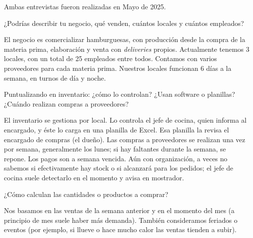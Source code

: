 
Ambas entrevistas fueron realizadas en Mayo de 2025.
\begin{description}[leftmargin=0cm, labelsep=0.5cm]

  \item[\textbf{Entrevistador:}] ¿Podrías describir tu negocio, qué venden, cuántos locales y cuántos empleados?

  \item[\textbf{Ulises Litterio:}] El negocio es comercializar hamburguesas, con producción desde la compra de la materia prima, elaboración y venta con \textit{deliveries} propios. Actualmente tenemos 3 locales, con un total de 25 empleados entre todos. Contamos con varios proveedores para cada materia prima. Nuestros locales funcionan 6 días a la semana, en turnos de día y noche.

  \item[\textbf{Entrevistador:}] Puntualizando en inventario: ¿cómo lo controlan? ¿Usan software o planillas? ¿Cuándo realizan compras a proveedores?

  \item[\textbf{Ulises Litterio:}] El inventario se gestiona por local. Lo controla el jefe de cocina, quien informa al encargado, y éste lo carga en una planilla de Excel. Esa planilla la revisa el encargado de compras (el dueño). Las compras a proveedores se realizan una vez por semana, generalmente los lunes; si hay faltantes durante la semana, se repone. Los pagos son a semana vencida. Aún con organización, a veces no sabemos si efectivamente hay stock o si alcanzará para los pedidos; el jefe de cocina suele detectarlo en el momento y avisa en mostrador.

  \item[\textbf{Entrevistador:}] ¿Cómo calculan las cantidades o productos a comprar?

  \item[\textbf{Ulises Litterio:}] Nos basamos en las ventas de la semana anterior y en el momento del mes (a principio de mes suele haber más demanda). También consideramos feriados o eventos (por ejemplo, si llueve o hace mucho calor las ventas tienden a subir).


\end{description}
